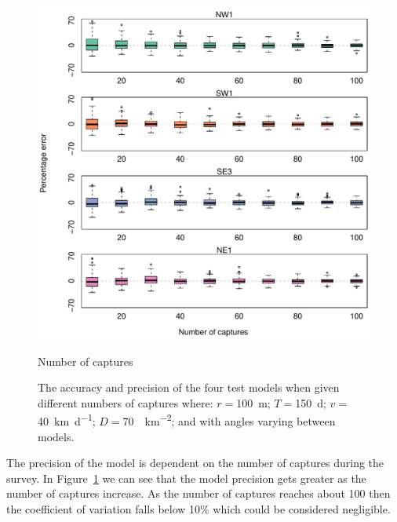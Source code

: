 \documentclass[a4paper,10pt,reqno,oneside]{amsart}
\begin{document}
\begin{figure}[t]
       \centering
	\includegraphics[width=1\textwidth]{imgs/ResultsNoCaptures.pdf}
         \caption{Number of captures}
           \label{f:Captures}
        \caption{ The accuracy and precision of the four test models when given different numbers of captures where: $r = $\SI{100}{\meter}; $T = $\SI{150}{\day}; $v = $ \SI{40}{\kilo\meter\per\day}; $D=$\SI{70}{\animals\per\kilo\meter\squared}; and with angles varying between models.
        } 
\end{figure}

The precision of the model is dependent on the number of captures during the survey. In Figure~\ref{f:Captures} we can see that the model precision gets greater as the number of captures increase. As the number of captures reaches about 100 then the coefficient of variation falls below 10\% which could be considered negligible. %
\end{document}
